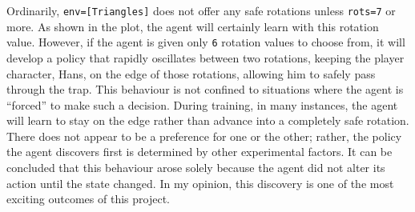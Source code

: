 Ordinarily, \texttt{env=[Triangles]} does not offer any safe rotations unless \texttt{rots=7} or more. As shown in the plot, the agent will certainly learn with this rotation value. However, if the agent is given only \texttt{6} rotation values to choose from, it will develop a policy that rapidly oscillates between two rotations, keeping the player character, Hans, on the edge of those rotations, allowing him to safely pass through the trap. This behaviour is not confined to situations where the agent is ``forced'' to make such a decision. During training, in many instances, the agent will learn to stay on the edge rather than advance into a completely safe rotation. There does not appear to be a preference for one or the other; rather, the policy the agent discovers first is determined by other experimental factors. It can be concluded that this behaviour arose solely because the agent did not alter its action until the state changed. In my opinion, this discovery is one of the most exciting outcomes of this project.